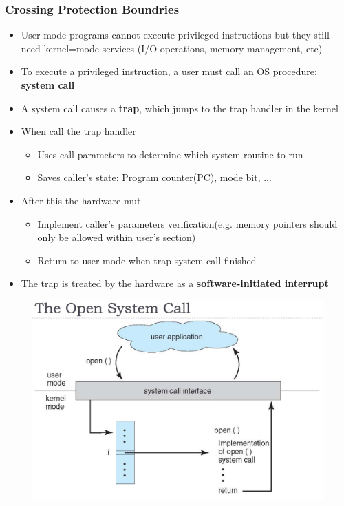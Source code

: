 \documentclass[11pt]{article}
\theoremstyle{definition}
\begin{document}
            \subsubsection{Crossing Protection Boundries}
                \begin{itemize}
                    \item User-mode programs cannot execute privileged instructions but they still need kernel=mode services (I/O operations, memory management, etc)
                    \item To execute a privileged instruction, a user must call an OS procedure: \textbf{system call}
                    \item A system call causes a \textbf{trap}, which jumps to the trap handler in the kernel
                    \item When call the trap handler
                        \begin{itemize}
                            \item Uses call parameters to determine which system routine to run
                            \item Saves caller's state: Program counter(PC), mode bit, ...
                        \end{itemize}
                    \item After this the hardware mut
                        \begin{itemize}
                            \item Implement caller's parameters verification(e.g. memory pointers should only be allowed within user's section)
                            \item Return to user-mode when trap system call finished
                        \end{itemize}
                    \item The trap is treated by the hardware as a \textbf{software-initiated interrupt}
                \end{itemize}
                \clearpage
                \begin{figure}[t]
                \centering
                \includegraphics[width=0.6\linewidth]{img/open_system_call.jpg}
        
            \end{figure}
\end{document}
